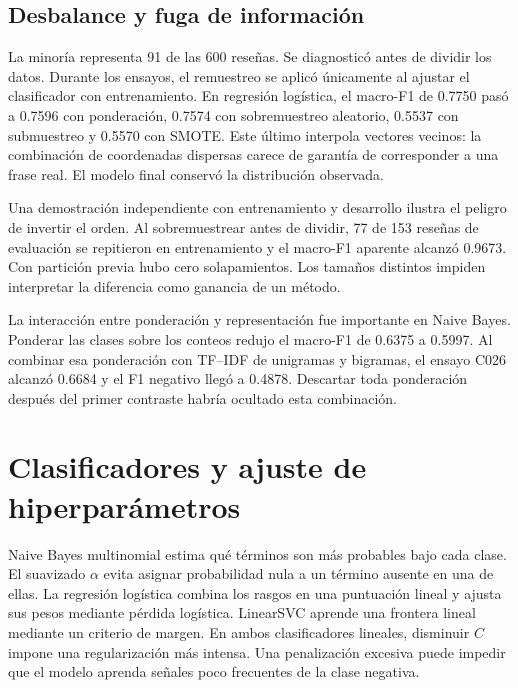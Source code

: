 \documentclass[11pt,letterpaper]{article}
\begin{document}
\subsection*{Desbalance y fuga de información}
La minoría representa 91 de las 600 reseñas. Se diagnosticó antes de dividir los datos. Durante los ensayos, el remuestreo se aplicó únicamente al ajustar el clasificador con entrenamiento. En regresión logística, el macro-F1 de 0.7750 pasó a 0.7596 con ponderación, 0.7574 con sobremuestreo aleatorio, 0.5537 con submuestreo y 0.5570 con SMOTE. Este último interpola vectores vecinos: la combinación de coordenadas dispersas carece de garantía de corresponder a una frase real. El modelo final conservó la distribución observada.

Una demostración independiente con entrenamiento y desarrollo ilustra el peligro de invertir el orden. Al sobremuestrear antes de dividir, 77 de 153 reseñas de evaluación se repitieron en entrenamiento y el macro-F1 aparente alcanzó 0.9673. Con partición previa hubo cero solapamientos. Los tamaños distintos impiden interpretar la diferencia como ganancia de un método.

La interacción entre ponderación y representación fue importante en Naive Bayes. Ponderar las clases sobre los conteos redujo el macro-F1 de 0.6375 a 0.5997. Al combinar esa ponderación con TF--IDF de unigramas y bigramas, el ensayo C026 alcanzó 0.6684 y el F1 negativo llegó a 0.4878. Descartar toda ponderación después del primer contraste habría ocultado esta combinación.
\newpage
\section{Clasificadores y ajuste de hiperparámetros}
Naive Bayes multinomial estima qué términos son más probables bajo cada clase. El suavizado $\alpha$ evita asignar probabilidad nula a un término ausente en una de ellas. La regresión logística combina los rasgos en una puntuación lineal y ajusta sus pesos mediante pérdida logística. LinearSVC aprende una frontera lineal mediante un criterio de margen. En ambos clasificadores lineales, disminuir $C$ impone una regularización más intensa. Una penalización excesiva puede impedir que el modelo aprenda señales poco frecuentes de la clase negativa.
\end{document}
